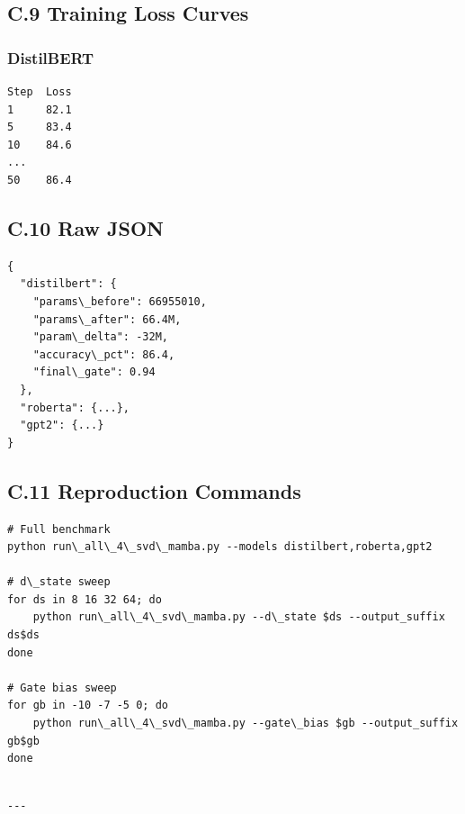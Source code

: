 \subsection{C.9 Training Loss Curves}

\subsubsection{DistilBERT}
\begin{lstlisting}
Step  Loss
1     82.1
5     83.4
10    84.6
...
50    86.4
\end{lstlisting}

\subsection{C.10 Raw JSON}

\begin{lstlisting}
{
  "distilbert": {
    "params\_before": 66955010,
    "params\_after": 66.4M,
    "param\_delta": -32M,
    "accuracy\_pct": 86.4,
    "final\_gate": 0.94
  },
  "roberta": {...},
  "gpt2": {...}
}
\end{lstlisting}

\subsection{C.11 Reproduction Commands}

\begin{lstlisting}
# Full benchmark
python run\_all\_4\_svd\_mamba.py --models distilbert,roberta,gpt2

# d\_state sweep
for ds in 8 16 32 64; do
    python run\_all\_4\_svd\_mamba.py --d\_state $ds --output_suffix ds$ds
done

# Gate bias sweep
for gb in -10 -7 -5 0; do
    python run\_all\_4\_svd\_mamba.py --gate\_bias $gb --output_suffix gb$gb
done
\end{lstlisting}
\begin{lstlisting}

---
\end{lstlisting}